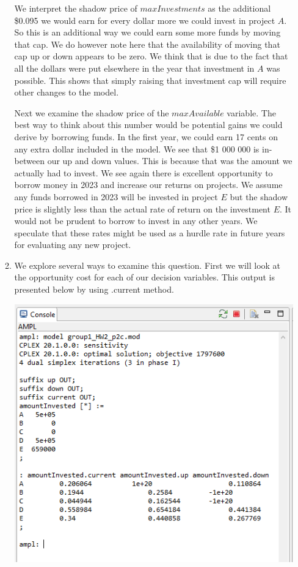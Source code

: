 \documentclass[11pt]{article}
\begin{document}
\begin{enumerate}
\begin{enumerate}
We interpret the shadow price of $maxInvestments$ as the additional \$0.095 we would earn for every dollar more we could invest in project $A$.  So this is an additional way we could earn some more funds by moving that cap.  We do however note here that the availability of moving that cap up or down appears to be zero.  We think that is due to the fact that all the dollars were put elsewhere in the year that investment in $A$ was possible.  This shows that simply raising that investment cap will require other changes to the model.  

Next we examine the shadow price of the $maxAvailable$ variable.  The best way to think about this number would be potential gains we could derive by borrowing funds.  In the first year, we could earn 17 cents on any extra dollar included in the model.  We see that \$1 000 000 is in-between our up and down values.  This is because that was the amount we actually had to invest.  We see again there is excellent opportunity to borrow money in 2023 and increase our returns on projects.  We assume any funds borrowed in 2023 will be invested in project $E$ but the shadow price is slightly less than the actual rate of return on the investment $E$.  It would not be prudent to borrow to invest in any other years.  We speculate that these rates might be used as a hurdle rate in future years for evaluating any new project.


\item We explore several ways to examine this question.  First we will look at the opportunity cost for each of our decision variables.  This output is presented below by using .current method.

\includegraphics[width = .9\textwidth]{output2c.png}


\end{enumerate}
\end{enumerate}
\end{document}
